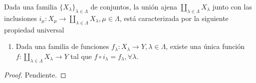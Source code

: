
\begin{theorem}
Dada una familia $\{ X_{\lambda} \}_{\lambda \in \Lambda}$ de conjuntos, la unión ajena $\coprod_{\lambda \in \Lambda} X_{\lambda}$ junto con las inclusiones $i_{\mu} : X_{\mu} \longrightarrow \coprod_{\lambda \in \Lambda} X_{\lambda}, \mu \in \Lambda$, está caracterizada por la siguiente propiedad universal
\begin{enumerate}[label=\textnormal{(\roman*)}]
\item Dada una familia de funciones $f_{\lambda} : X_{\lambda} \longrightarrow Y, \lambda \in \Lambda$, existe una única función $f : \coprod_{\lambda \in \Lambda} X_{\lambda} \longrightarrow Y$ tal que $f \circ i_{\lambda} = f_{\lambda}, \forall \lambda$.
\bigskip

\end{enumerate}
\end{theorem}

\begin{proof}
Pendiente.
\end{proof}
